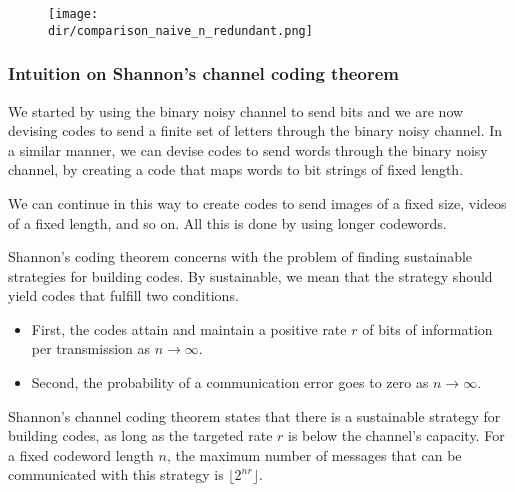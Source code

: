 \begin{figure}
\texttt{[image: \\dir/comparison\_naive\_n\_redundant.png]}
\caption{}
\label{fig:comparison_naive_n_redundant}
\end{figure}

\subsubsection*{Intuition on Shannon's channel coding theorem}

We started by using the binary noisy channel to send bits and we are now devising codes to send a finite set of letters through the binary noisy channel. In a similar manner, we can devise codes to send words through the binary noisy channel, by creating a code that maps words to bit strings of fixed length. 

We can continue in this way to create codes to send images of a fixed size, videos of a fixed length, and so on. All this is done by using longer codewords. 


Shannon's coding theorem concerns with the problem of finding sustainable strategies for building codes. By sustainable, we mean that the strategy should yield codes that fulfill two conditions. 
%
\begin{itemize}
\item First, the codes attain and maintain a positive rate $r$ of bits of information per transmission as $n \to \infty$.
\item Second, the probability of a communication error goes to zero as $n \to \infty$.
\end{itemize}

Shannon's channel coding theorem states that there is a sustainable strategy for building codes, as long as the targeted rate $r$ is below the channel's capacity. For a fixed codeword length $n$, the maximum number of messages that can be communicated with this strategy is $\lfloor 2^{nr}\rfloor$.

